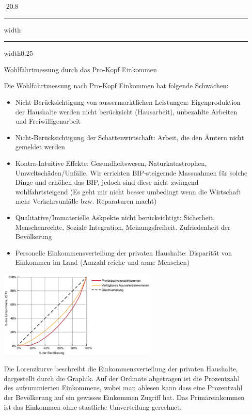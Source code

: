 \documentclass[9pt, landscape, fleqn]{scrartcl}
\makeatletter
\renewcommand{\subsection}{\@startsection{subsection}{1}{0mm}%
{-2\baselineskip}{0.8\baselineskip}%
{\hrule depth 0.2pt width\columnwidth\hrule depth0.75pt
width0.25\columnwidth\vspace*{1.2em}\large\bfseries\rmfamily}}
\makeatother
\begin{document}
\begin{multicols*}{3}
\subsection{Wohlfahrtmessung durch das Pro-Kopf Einkommen}

Die Wohlfahrtmessung nach Pro-Kopf Einkommen hat folgende Schwächen:

\begin{itemize}
    \item Nicht-Berücksichtigung von aussermarktlichen Leistungen: Eigenproduktion der Haushalte werden nicht berücksicht (Hausarbeit), unbezahlte Arbeiten und Freiwilligenarbeit
    \item Nicht-Berücksichtigung der Schattenwirtschaft: Arbeit, die den Ämtern nicht gemeldet werden
    \item Kontra-Intuitive Effekte: Gesundheitswesen, Naturkatastrophen, Umweltschäden/Unfälle. Wir errichten BIP-steigernde Massnahmen für solche Dinge und erhöhen das BIP, jedoch sind diese nicht zwingend wohlfahrtsteigend (Es geht mir nicht besser umbedingt wenn die Wirtschaft mehr Verkehrsunfälle bzw. Reparaturen macht)
    \item Qualitative/Immaterielle Askpekte nicht berücksichtigt: Sicherheit, Menschenrechte, Soziale Integration, Meinungsfreiheit, Zufriedenheit der Bevölkerung
    \item Personelle Einkommensverteilung der privaten Haushalte: Disparität von Einkommen im Land (Amzahl reiche und arme Menschen)
\end{itemize}

\begin{center}
    \includegraphics[width=8cm]{Lorenzkurve.png}
\end{center}

Die Lorenzkurve beschreibt die Einkommensverteilung der privaten Haushalte, dargestellt durch die Graphik. Auf der Ordinate abgetragen ist die Prozentzahl des aufsummierten Einkommens, wobei man ablesen kann dass eine Prozentzahl der Bevölkerung auf ein gewisses Einkommen Zugriff hat. Das Primäreinkommen ist das Einkommen ohne staatliche Umverteilung gerechnet. \newline \newline


\end{multicols*}
\end{document}

